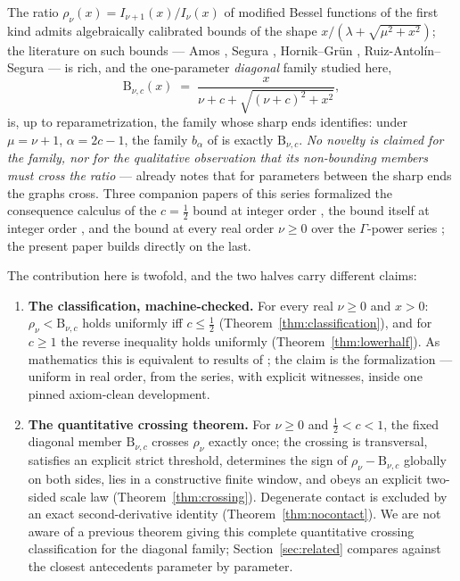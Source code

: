 \documentclass[11pt]{article}
\newcommand{\Bfam}{\mathrm{B}}
\begin{document}
The ratio $\rho_\nu(x) = I_{\nu+1}(x)/I_\nu(x)$ of modified Bessel
functions of the first kind admits algebraically calibrated bounds
of the shape $x/(\lambda+\sqrt{\mu^2+x^2})$; the literature on such
bounds --- Amos \cite{Amos74}, Segura
\cite{Segura11,Segura21,Segura23}, Hornik--Gr\"un \cite{HG13,HG24},
Ruiz-Antol\'in--Segura \cite{RS16} --- is rich, and the
one-parameter \emph{diagonal} family studied here,
\[
\Bfam_{\nu,c}(x) \;=\; \frac{x}{\nu+c+\sqrt{(\nu+c)^2+x^2}},
\]
is, up to reparametrization, the family whose sharp ends
\cite{RS16} identifies: under $\mu = \nu+1$, $\alpha = 2c-1$, the
family $b_\alpha$ of \cite{RS16} is exactly $\Bfam_{\nu,c}$.
\emph{No novelty is claimed for the family, nor for the qualitative
observation that its non-bounding members must cross the ratio}
--- \cite{RS16} already notes that for parameters between the sharp
ends the graphs cross.  Three companion papers of this series
formalized the consequence calculus of the $c=\tfrac12$ bound at
integer order \cite{ErikssonC2}, the bound itself at integer order
\cite{ErikssonC3}, and the bound at every real order $\nu \ge 0$
over the $\Gamma$-power series \cite{ErikssonC4}; the present paper
builds directly on the last.

The contribution here is twofold, and the two halves carry
different claims:
\begin{enumerate}
\item \textbf{The classification, machine-checked.}  For every real
$\nu \ge 0$ and $x > 0$: $\rho_\nu < \Bfam_{\nu,c}$ holds uniformly
iff $c \le \tfrac12$ (Theorem~\ref{thm:classification}), and for
$c \ge 1$ the reverse inequality holds uniformly
(Theorem~\ref{thm:lowerhalf}).  As mathematics this is equivalent
to results of \cite{RS16}; the claim is the formalization ---
uniform in real order, from the series, with explicit
witnesses, inside one pinned axiom-clean development.
\item \textbf{The quantitative crossing theorem.}  For $\nu \ge 0$
and $\tfrac12 < c < 1$, the fixed diagonal member $\Bfam_{\nu,c}$
crosses $\rho_\nu$ exactly once; the crossing is transversal,
satisfies an explicit strict threshold, determines the sign of
$\rho_\nu - \Bfam_{\nu,c}$ globally on both sides, lies in a
constructive finite window, and obeys an explicit two-sided scale
law (Theorem~\ref{thm:crossing}).  Degenerate contact is excluded
by an exact second-derivative identity
(Theorem~\ref{thm:nocontact}).  We are not aware of a previous
theorem giving this complete quantitative crossing classification
for the diagonal family; Section~\ref{sec:related} compares against
the closest antecedents parameter by parameter.
\end{enumerate}
\end{document}
